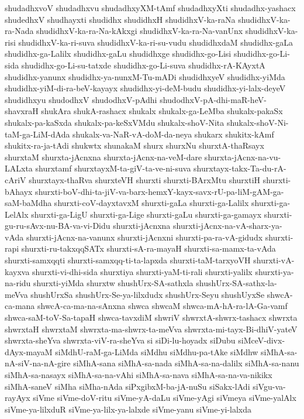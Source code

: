 {shudadhxvoV
shudadhxvu
shudadhxyXM-tAmf
shudadhxyXti
shudadhx-yashacx
shudedhxV
shudhayxti
shudidhx
shudidhxH
shudidhxV-ka-raNa
shudidhxV-ka-ra-Nada
shudidhxV-ka-ra-Na-kAkxgi
shudidhxV-ka-ra-Na-vanUnx
shudidhxV-ka-risi
shudidhxV-ka-ri-suva
shudidhxV-ka-ri-su-vudu
shudidhxdaM
shudidhx-gaLa
shudidhx-ga-Lalilx
shudidhx-gaLu
shudidhxge
shudidhx-go-Lisi
shudidhx-go-Li-sida
shudidhx-go-Li-su-tatxde
shudidhx-go-Li-suva
shudidhx-rA-KAyxtA
shudidhx-yanunx
shudidhx-ya-nunxM-Tu-mADi
shudidhxyeV
shudidhx-yiMda
shudidhx-yiM-di-ra-beV-kayayx
shudidhx-yi-deM-budu
shudidhx-yi-lalx-deyeV
shudidhxyu
shudodhxV
shudodhxV-pAdhi
shudodhxV-pA-dhi-maR-heV-shavxraH
shukAra
shukA-rashacx
shukalx
shukalx-ga-LeMba
shukalx-pakaSx
shukalx-pa-kaSxda
shukalx-pa-keSxVMdu
shukalx-shoV-Nita
shukalx-shoV-Ni-taM-ga-LiM-dAda
shukalx-va-NaR-vA-doM-da-neya
shukarx
shukitx-kAmf
shukitx-ra-ja-tAdi
shukwtx
shunakaM
shurx
shurxNu
shurxtA-thaRsayx
shurxtaM
shurxta-jAcnxna
shurxta-jAcnx-na-veM-dare
shurxta-jAcnx-na-vu-LALxta
shurxtamf
shurxtayxM-ta-giV-ta-ve-ni-suva
shurxtayx-takx-Ta-du-rA-cAriV
shurxtayx-thaRva
shurxteVH
shurxti
shurxti-BArxMtu
shurxtiH
shurxti-bAhayx
shurxti-boV-dhi-ta-jiV-va-barx-hemxY-kayx-savx-rU-pa-liM-gAM-ga-saM-baMdha
shurxti-coV-dayxtavxM
shurxti-gaLa
shurxti-ga-Lalilx
shurxti-ga-LelAlx
shurxti-ga-LigU
shurxti-ga-Lige
shurxti-gaLu
shurxti-ga-gamayx
shurxti-gu-ru-sAvx-nu-BA-va-vi-Didu
shurxti-jAcnxna
shurxti-jAcnx-na-vA-sharx-ya-vAda
shurxti-jAcnx-na-vanunx
shurxti-jAcnxni
shurxti-pa-ra-vA-gidudx
shurxti-rapi
shurxti-ru-takxqqSATx
shurxti-sA-ra-mayaH
shurxti-sa-mamx-ta-vAda
shurxti-samxqqti
shurxti-samxqq-ti-ta-lapxda
shurxti-taM-tarxyoVH
shurxti-vA-kayxva
shurxti-vi-dhi-sida
shurxtiya
shurxti-yaM-ti-rali
shurxti-yalilx
shurxti-ya-na-ridu
shurxti-yiMda
shurxtw
shushUrx-SA-sathxla
shushUrx-SA-sathx-la-meVva
shushUrxSa
shushUrx-Se-ya-lilxdudx
shushUrx-Seyu
shushUyxSe
shwcA-ca-mana
shwcA-ca-ma-na-sAnxna
shwca
shwcaM
shwca-mA-hA-ra-lA-Ga-vamf
shwca-saM-toV-Sa-tapaH
shwca-tavxdiM
shwriV
shwrxtA-shwrx-tashacx
shwrxta
shwrxtaH
shwrxtaM
shwrxta-ma-shwrx-ta-meVva
shwrxta-mi-tayx-Bi-dhiV-yateV
shwrxta-sheYva
shwrxta-viV-ra-sheYva
si
siDi-lu-hoyadx
siDubu
siMceV-divx-dAyx-mayaM
siMdhU-raM-ga-LiMda
siMdhu
siMdhu-pa-tAke
siMdhw
siMhA-sa-nA-siV-na-nA-gire
siMhA-sana
siMhA-sa-nada
siMhA-sa-na-dalilx
siMhA-sa-nanu
siMhA-sa-nasayx
siMhA-sa-na-vAhi
siMhA-sa-nava
siMhA-sa-na-va-nikikx
siMhA-saneV
siMha
siMha-nAda
siPxgibxM-ba-jA-nuSu
siSakx-lAdi
siVgu-va-rayAyx
siVme
siVme-doV-ritu
siVme-yA-daLu
siVme-yAgi
siVmeya
siVme-yalAlx
siVme-ya-lilxduR
siVme-ya-lilx-ya-lalxde
siVme-yanu
siVme-yi-lalxda
}

